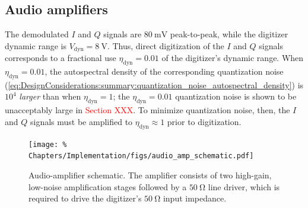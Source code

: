 \subsection{Audio amplifiers}
\label{sec:Implementation:Hardware:audio_amps}
\graffito{\textcolor{red}{digitizer parameters?}}
The demodulated $I$ and $Q$ signals are $\SI{80}{\milli\volt}$ peak-to-peak,
while the digitizer dynamic range is $V_{\text{dyn}} = \SI{8}{\volt}$.
Thus, direct digitization of the $I$ and $Q$ signals
corresponds to a fractional use $\eta_{\text{dyn}} = 0.01$
of the digitizer's dynamic range.
When $\eta_{\text{dyn}} = 0.01$,
the autospectral density of the corresponding quantization noise
(\ref{eq:DesignConsiderations:summary:quantization_noise_autospectral_density})
is $10^4$ \emph{larger} than when $\eta_{\text{dyn}} = 1$;
the $\eta_{\text{dyn}} = 0.01$ quantization noise
is shown to be unacceptably large in \textcolor{red}{Section XXX}.
To minimize quantization noise, then, the $I$ and $Q$ signals
must be amplified to $\eta_{\text{dyn}} \approx 1$ prior to digitization.

\begin{figure}
  \centering
  \texttt{[image: \%
    Chapters/Implementation/figs/audio\_amp\_schematic.pdf]}
  \caption[Audio-amplifier schematic]{%
    Audio-amplifier schematic.
    The amplifier consists of
    two high-gain, low-noise amplification stages
    followed by a $\SI{50}{\ohm}$ line driver,
    which is required to drive the digitizer's
    $\SI{50}{\ohm}$ input impedance.
  }
\label{fig:Implementation:audio_amplifier_schematic}
\end{figure}

